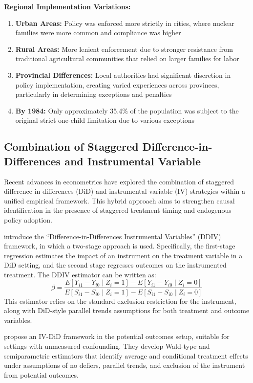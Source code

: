 \documentclass[12pt,english]{article}
\begin{document}
	\textbf{Regional Implementation Variations:} 
	\begin{enumerate}
		\item \textbf{Urban Areas:} Policy was enforced more strictly in cities, where nuclear families were more common and compliance was higher
		\item \textbf{Rural Areas:} More lenient enforcement due to stronger resistance from traditional agricultural communities that relied on larger families for labor
		\item \textbf{Provincial Differences:} Local authorities had significant discretion in policy implementation, creating varied experiences across provinces, particularly in determining exceptions and penalties
		\item \textbf{By 1984:} Only approximately 35.4\% of the population was subject to the original strict one-child limitation due to various exceptions
	\end{enumerate}
	
	\subsection{Combination of Staggered Difference-in-Differences and Instrumental Variable}
	Recent advances in econometrics have explored the combination of staggered difference-in-differences (DiD) and instrumental variable (IV) strategies within a unified empirical framework. This hybrid approach aims to strengthen causal identification in the presence of staggered treatment timing and endogenous policy adoption.
	
	\cite{hudson2017} introduce the ``Difference-in-Differences Instrumental Variables'' (DDIV) framework, in which a two-stage approach is used. Specifically, the first-stage regression estimates the impact of an instrument on the treatment variable in a DiD setting, and the second stage regresses outcomes on the instrumented treatment. The DDIV estimator can be written as:
	\[
	\beta = \frac{E[Y_{i1} - Y_{i0} \mid Z_i = 1] - E[Y_{i1} - Y_{i0} \mid Z_i = 0]}{E[S_{i1} - S_{i0} \mid Z_i = 1] - E[S_{i1} - S_{i0} \mid Z_i = 0]}
	\]
	This estimator relies on the standard exclusion restriction for the instrument, along with DiD-style parallel trends assumptions for both treatment and outcome variables.
	
	\cite{ye2023} propose an IV-DiD framework in the potential outcomes setup, suitable for settings with unmeasured confounding. They develop Wald-type and semiparametric estimators that identify average and conditional treatment effects under assumptions of no defiers, parallel trends, and exclusion of the instrument from potential outcomes.
	
\end{document}

